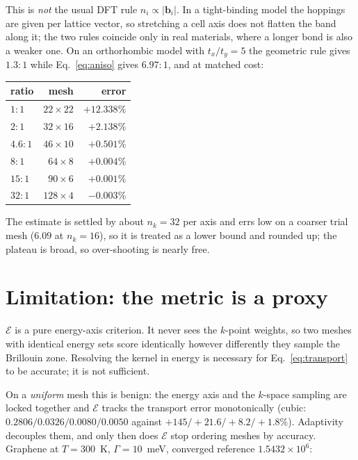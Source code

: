 \documentclass[11pt,a4paper]{article}
\begin{document}
This is \emph{not} the usual DFT rule $n_i\propto|\mathbf{b}_i|$. In a
tight-binding model the hoppings are given per lattice vector, so stretching a
cell axis does not flatten the band along it; the two rules coincide only in
real materials, where a longer bond is also a weaker one. On an orthorhombic
model with $t_x/t_y=5$ the geometric rule gives $1.3:1$ while
Eq.~\eqref{eq:aniso} gives $6.97:1$, and at matched cost:

\begin{center}
\begin{tabular}{lrr}
\toprule
ratio & mesh & error \\
\midrule
$1:1$    & $22\times22$ & $+12.338\%$ \\
$2:1$    & $32\times16$ & $+2.138\%$ \\
$4.6:1$  & $46\times10$ & $+0.501\%$ \\
$8:1$    & $64\times8$  & $+0.004\%$ \\
$15:1$   & $90\times6$  & $+0.001\%$ \\
$32:1$   & $128\times4$ & $-0.003\%$ \\
\bottomrule
\end{tabular}
\end{center}

\noindent
The estimate is settled by about $n_k=32$ per axis and errs low on a coarser
trial mesh ($6.09$ at $n_k=16$), so it is treated as a lower bound and rounded
up; the plateau is broad, so over-shooting is nearly free.

\section{Limitation: the metric is a proxy}
\label{sec:proxy}

$\mathcal{E}$ is a pure energy-axis criterion. It never sees the $k$-point
weights, so two meshes with identical energy sets score identically however
differently they sample the Brillouin zone. Resolving the kernel in energy is
necessary for Eq.~\eqref{eq:transport} to be accurate; it is not sufficient.

On a \emph{uniform} mesh this is benign: the energy axis and the $k$-space
sampling are locked together and $\mathcal{E}$ tracks the transport error
monotonically (cubic: $0.2806/0.0326/0.0080/0.0050$ against
$+145/+21.6/+8.2/+1.8\%$). Adaptivity decouples them, and only then does
$\mathcal{E}$ stop ordering meshes by accuracy. Graphene at $T=300$~K,
$\Gamma=10$~meV, converged reference $1.5432\times10^{6}$:
\end{document}
